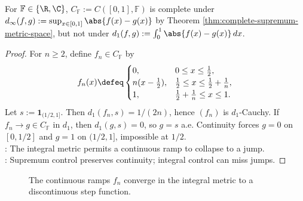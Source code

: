 \begin{example} \label{ex:continuous-functions-sup-complete-integral-not-complete} \\
For $\mathbb{F}\in\{\R,\C\}$, $C_{\mathbb{F}}:=C([0,1],\mathbb{F})$ is complete under $d_\infty(f,g):=\sup_{x\in[0,1]}\abs{f(x)-g(x)}$ by Theorem \ref{thm:complete-supremum-metric-space}, but not under $d_1(f,g):=\int_0^1\abs{f(x)-g(x)}\,dx$.
\begin{proof}
For $n\ge2$, define $f_n\in C_{\mathbb{F}}$ by
\begin{equation*}
f_n(x)\defeq
\begin{cases}
0,&0\le x\le \frac12,\\
n(x-\frac12),&\frac12\le x\le \frac12+\frac1n,\\
1,&\frac12+\frac1n\le x\le1.
\end{cases}
\end{equation*}
Let $s:=\mathbf{1}_{(1/2,1]}$. Then $d_1(f_n,s)=1/(2n)$, hence $(f_n)$ is $d_1$-Cauchy. If $f_n\to g\in C_{\mathbb{F}}$ in $d_1$, then $d_1(g,s)=0$, so $g=s$ a.e. Continuity forces $g=0$ on $[0,1/2]$ and $g=1$ on $(1/2,1]$, impossible at $1/2$.\\
: The integral metric permits a continuous ramp to collapse to a jump.\\
: Supremum control preserves continuity; integral control can miss jumps.
\end{proof}
\end{example}

\begin{figure}[H]
  \centering
  
  \caption{The continuous ramps $f_n$ converge in the integral metric to a
  discontinuous step function.}
  \label{fig:continuous-functions-integral-metric-not-complete}
\end{figure}

